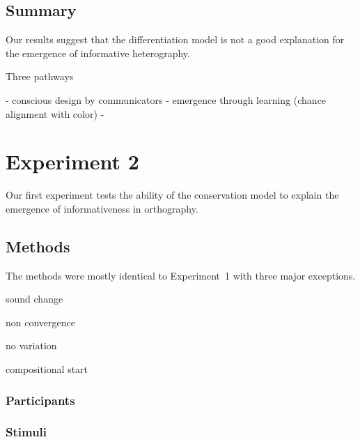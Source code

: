\documentclass[doc,biblatex]{apa7}
\begin{document}
\subsection{Summary}

Our results suggest that the differentiation model is not a good explanation for the emergence of informative heterography. 

Three pathways

- conscious design by communicators
- emergence through learning (chance alignment with color)
- 


\section{Experiment 2}

Our first experiment tests the ability of the conservation model to explain the emergence of informativeness in orthography.

\subsection{Methods}

The methods were mostly identical to Experiment~1 with three major exceptions.

sound change

non convergence

no variation

compositional start

\subsubsection{Participants}

\subsubsection{Stimuli}
\end{document}
